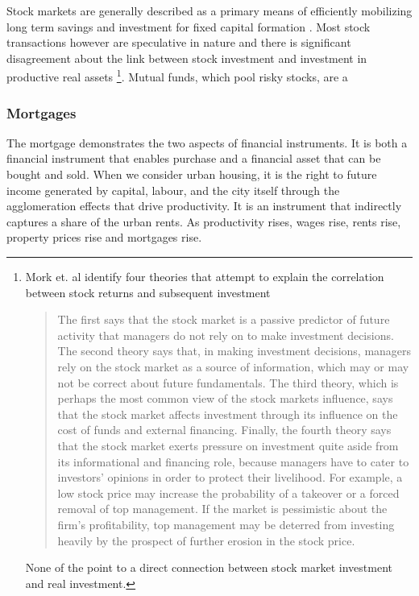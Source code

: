 Stock markets are  generally described as a primary means of efficiently mobilizing long term savings and investment for  fixed capital formation \cite{azfarMarketMobilizedCapital2003}. Most stock transactions however are speculative in nature and there is significant disagreement about the link between stock investment and investment in productive real assets \footnote{Mork et. al \cite{morckStockMarketInvestment1990} identify four theories that attempt to explain the correlation between stock returns and subsequent investment \begin{quotation}The first says that the stock market is a passive predictor of future activity that managers do not rely on to make investment decisions. The second theory says that, in making investment decisions, managers rely on the stock market as a source of information, which may or may not be correct about future fundamentals. The third theory, which is perhaps the most common view of the stock markets influence, says that the stock market affects investment through its influence on the cost of funds and external financing. Finally, the fourth theory says that the stock market exerts pressure on investment quite aside from its informational and financing role, because managers have to cater to investors' opinions in order to protect their livelihood. For example, a low stock price may increase the probability of a takeover or a forced removal of top management. If the market is pessimistic about the firm's profitability, top management may be deterred from investing heavily by the prospect of further erosion in the stock price.\end{quotation} None of the point to a direct connection between stock market investment and real investment.}. 
Mutual funds, which pool risky stocks, are a %


\subsubsection{Mortgages}
The mortgage demonstrates the two aspects of financial instruments. It is both a financial instrument that enables  purchase and a financial asset that can be bought and sold. When we consider urban housing, it is the right to future income generated by capital, labour, and the city itself through the agglomeration effects that drive productivity. It is an instrument that indirectly captures a share of the urban rents. As productivity rises, wages rise, rents rise, property prices rise and mortgages rise. 

